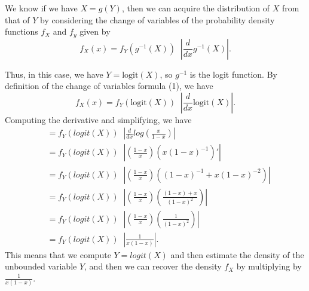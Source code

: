 \documentclass[12pt,twoside]{smiththesis}
\begin{document}
We know if we have \(X = g(Y)\), then we can acquire the distribution of \(X\) from that of \(Y\) by considering the change of variables of the probability density functions \(f_X\) and \(f_y\) given by
\[f_X(x) = f_Y(g^{-1}(X)) \;\; \left| \frac{d}{dx} g^{-1}(X) \right|. \tag{1}\]

Thus, in this case, we have \(Y = \text{logit}(X)\), so \(g^{-1}\) is the logit function. By definition of the change of variables formula (1), we have
\[f_X(x) = f_Y(\text{logit}(X)) \;\; \left| \frac{d}{dx} \text{logit}(X) \right|.\]
Computing the derivative and simplifying, we have
\begin{align*} &= f_Y(logit(X)) \;\; \left| \frac{d}{dx}log(\frac{x}{1-x}) \right|\\
&= f_Y(logit(X)) \;\; \left| \left(\frac{1-x}{x} \right) (x(1-x)^{-1})' \right|\\ 
&= f_Y(logit(X)) \;\; \left| \left(\frac{1-x}{x} \right) ((1-x)^{-1} + x(1-x)^{-2} ) \right|\\
&= f_Y(logit(X)) \;\; \left| \left(\frac{1-x}{x} \right) \left(\frac{(1-x) + x }{ (1-x)^{2} }\right) \right|\\
&= f_Y(logit(X)) \;\; \left| \left(\frac{1-x}{x} \right) \left(\frac{1 }{ (1-x)^{2} }\right) \right|\\
&= f_Y(logit(X)) \;\; \left|  \frac{1 }{ x (1-x) } \right|.
\end{align*}
This means that we compute \(Y = logit(X)\) and then estimate the density of the unbounded variable \(Y\), and then we can recover the density \(f_X\) by multiplying by \(\frac{1 }{ x (1-x) }\).
\end{document}
